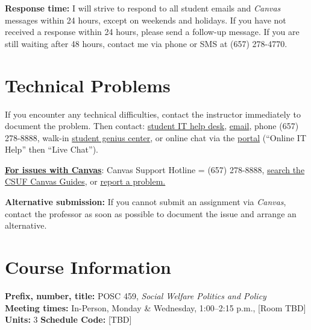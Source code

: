 \documentclass[12pt]{article}
\begin{document}
\vspace{0.5em}
\noindent \textbf{Response time:} I will strive to respond to all student emails and \emph{Canvas} messages within 24 hours, except on weekends and holidays. If you have not received a response within 24 hours, please send a follow-up message. If you are still waiting after 48 hours, contact me via phone or SMS at (657) 278-4770.

\section*{Technical Problems}

If you encounter any technical difficulties, contact the instructor immediately to document the problem. Then contact: \href{http://www.fullerton.edu/it/students/helpdesk/index.php}{student IT help desk}, \href{mailto:StudentITHelpDesk@fullerton.edu}{email}, phone (657) 278-8888, walk-in \href{http://www.fullerton.edu/it/students/sgc/index.php}{student genius center}, or online chat via the \href{http://my.fullerton.edu}{portal} (``Online IT Help'' then ``Live Chat'').

\vspace{0.5em}
\noindent \textbf{\underline{For issues with Canvas}}: Canvas Support Hotline = (657) 278-8888, \href{https://canvashelp.fullerton.edu/}{search the CSUF Canvas Guides}, or \href{https://titans.service-now.com/sp?id=sc_cat_item&sys_id=f88efe80ebea6a10fb7cfcffcad0cdc6&subject=Canvas}{report a problem.}

\vspace{0.5em}
\noindent \textbf{Alternative submission:} If you cannot submit an assignment via \emph{Canvas}, contact the professor as soon as possible to document the issue and arrange an alternative.

\section*{Course Information}
\noindent \textbf{Prefix, number, title:} POSC 459, \textit{Social Welfare Politics and Policy} \\
\noindent \textbf{Meeting times:} In-Person, Monday \& Wednesday, 1:00--2:15 p.m., [Room TBD] \\
\noindent \textbf{Units:} 3 \quad \textbf{Schedule Code:} [TBD]
\end{document}
